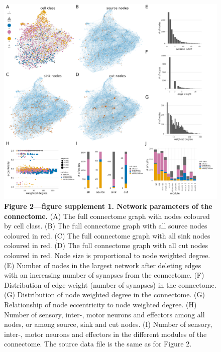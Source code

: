 \documentclass[
  11pt,
]{article}
\begin{document}
\begin{figure}[H]

{\centering \includegraphics[width=1\textwidth,height=\textheight]{Figures/Figure2_fig_suppl1.png}

}

\caption{\textbf{Figure 2---figure supplement 1. Network parameters of
the connectome.} (A) The full connectome graph with nodes coloured by
cell class. (B) The full connectome graph with all source nodes coloured
in red. (C) The full connectome graph with all sink nodes coloured in
red. (D) The full connectome graph with all cut nodes coloured in red.
Node size is proportional to node weighted degree. (E) Number of nodes
in the largest network after deleting edges with an increasing number of
synapses from the connectome. (F) Distribution of edge weight (number of
synapses) in the connectome. (G) Distribution of node weighted degree in
the connectome. (G) Relationship of node eccentricity to node weighted
degree. (H) Number of sensory, inter-, motor neurons and effectors among
all nodes, or among source, sink and cut nodes. (I) Number of sensory,
inter-, motor neurons and effectors in the different modules of the
connectome. The source data file is the same as for Figure 2.}

\end{figure}%
\end{document}
